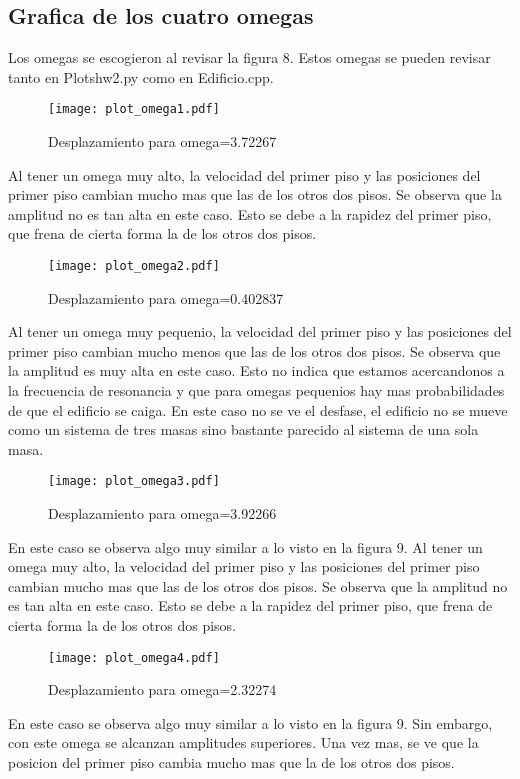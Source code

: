 \documentclass[11pt,letterpaper]{exam}
\begin{document}
\subsection{Grafica de los cuatro omegas}
Los omegas se escogieron al revisar la figura 8.
Estos omegas se pueden revisar tanto en Plotshw2.py como en Edificio.cpp. 
\begin{figure}[H]
    \centering
    \texttt{[image: plot\_omega1.pdf]}
    \caption{ Desplazamiento para omega=3.72267}
    \label{fig:my_label}
\end{figure}
Al tener un omega muy alto, la velocidad del primer piso y las posiciones del primer piso cambian mucho mas que las de los otros dos pisos. Se observa que la amplitud no es tan alta en este caso. Esto se debe a la rapidez del primer piso, que frena de cierta forma la de los otros dos pisos.
\begin{figure}[H]
    \centering
    \texttt{[image: plot\_omega2.pdf]}
    \caption{ Desplazamiento para omega=0.402837}
    \label{fig:my_label}
\end{figure}
Al tener un omega muy pequenio, la velocidad del primer piso y las posiciones del primer piso cambian mucho menos que las de los otros dos pisos. Se observa que la amplitud es muy alta en este caso. Esto no indica que estamos acercandonos a la frecuencia de resonancia y que para omegas pequenios hay mas probabilidades de que el edificio se caiga. En este caso no se ve el desfase, el edificio no se mueve como un sistema de tres masas sino bastante parecido al sistema de una sola masa. 
\begin{figure}[H]
    \centering
    \texttt{[image: plot\_omega3.pdf]}
    \caption{Desplazamiento para omega=3.92266}
    \label{fig:my_label}
\end{figure}
En este caso se observa algo muy similar a lo visto en la figura 9. Al tener un omega muy alto, la velocidad del primer piso y las posiciones del primer piso cambian mucho mas que las de los otros dos pisos. Se observa que la amplitud no es tan alta en este caso. Esto se debe a la rapidez del primer piso, que frena de cierta forma la de los otros dos pisos.
\begin{figure}[H]
    \centering
    \texttt{[image: plot\_omega4.pdf]}
    \caption{Desplazamiento para omega=2.32274}
    \label{fig:my_label}
\end{figure}
En este caso se observa algo muy similar a lo visto en la figura 9. Sin embargo, con este omega se alcanzan amplitudes superiores. Una vez mas, se ve que la posicion del primer piso cambia mucho mas que la de los otros dos pisos. 
\end{document}
